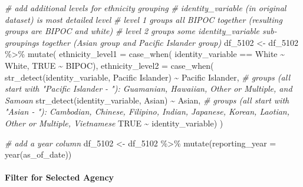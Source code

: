 \documentclass[
]{article}
\newenvironment{Shaded}{\begin{snugshade}}{\end{snugshade}}
\newcommand{\AttributeTok}[1]{\textcolor[rgb]{0.77,0.63,0.00}{#1}}
\newcommand{\CommentTok}[1]{\textcolor[rgb]{0.56,0.35,0.01}{\textit{#1}}}
\newcommand{\ConstantTok}[1]{\textcolor[rgb]{0.00,0.00,0.00}{#1}}
\newcommand{\FunctionTok}[1]{\textcolor[rgb]{0.00,0.00,0.00}{#1}}
\newcommand{\NormalTok}[1]{#1}
\newcommand{\OtherTok}[1]{\textcolor[rgb]{0.56,0.35,0.01}{#1}}
\newcommand{\SpecialCharTok}[1]{\textcolor[rgb]{0.00,0.00,0.00}{#1}}
\newcommand{\StringTok}[1]{\textcolor[rgb]{0.31,0.60,0.02}{#1}}
\begin{document}
\begin{Shaded}
\begin{Highlighting}[]
\CommentTok{\# add additional levels for ethnicity grouping}
\CommentTok{\#   identity\_variable (in original dataset) is most detailed level}
\CommentTok{\#   level 1 groups all BIPOC together (resulting groups are BIPOC and white)}
\CommentTok{\#   level 2 groups some identity\_variable sub{-}groupings together (Asian group and Pacific Islander group)}
\NormalTok{df\_5102 }\OtherTok{\textless{}{-}}\NormalTok{ df\_5102 }\SpecialCharTok{\%\textgreater{}\%} 
    \FunctionTok{mutate}\NormalTok{(}
        \AttributeTok{ethnicity\_level1 =} \FunctionTok{case\_when}\NormalTok{(}
\NormalTok{            identity\_variable }\SpecialCharTok{==} \StringTok{\textquotesingle{}White\textquotesingle{}} \SpecialCharTok{\textasciitilde{}} \StringTok{\textquotesingle{}White\textquotesingle{}}\NormalTok{, }
            \ConstantTok{TRUE} \SpecialCharTok{\textasciitilde{}} \StringTok{\textquotesingle{}BIPOC\textquotesingle{}}\NormalTok{),}
        \AttributeTok{ethnicity\_level2 =} \FunctionTok{case\_when}\NormalTok{(}
            \FunctionTok{str\_detect}\NormalTok{(identity\_variable, }\StringTok{\textquotesingle{}Pacific Islander\textquotesingle{}}\NormalTok{) }\SpecialCharTok{\textasciitilde{}} \StringTok{\textquotesingle{}Pacific Islander\textquotesingle{}}\NormalTok{, }\CommentTok{\# groups (all start with "Pacific Islander {-} "): Guamanian, Hawaiian, Other or Multiple, and Samoan}
            \FunctionTok{str\_detect}\NormalTok{(identity\_variable, }\StringTok{\textquotesingle{}Asian\textquotesingle{}}\NormalTok{) }\SpecialCharTok{\textasciitilde{}} \StringTok{\textquotesingle{}Asian\textquotesingle{}}\NormalTok{, }\CommentTok{\# groups (all start with "Asian {-} "): Cambodian, Chinese, Filipino, Indian, Japanese, Korean, Laotian, Other or Multiple, Vietnamese}
            \ConstantTok{TRUE} \SpecialCharTok{\textasciitilde{}}\NormalTok{ identity\_variable)}
\NormalTok{    )}

\CommentTok{\# add a year column}
\NormalTok{df\_5102 }\OtherTok{\textless{}{-}}\NormalTok{ df\_5102 }\SpecialCharTok{\%\textgreater{}\%} 
    \FunctionTok{mutate}\NormalTok{(}\AttributeTok{reporting\_year =} \FunctionTok{year}\NormalTok{(as\_of\_date))}
\end{Highlighting}
\end{Shaded}

\hypertarget{filter-for-selected-agency}{%
\paragraph{Filter for Selected
Agency}\label{filter-for-selected-agency}}
\end{document}
